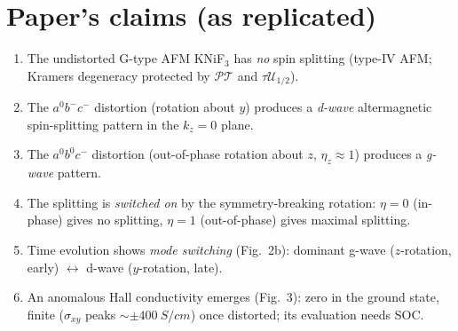 \documentclass[11pt]{article}
\begin{document}
\section{Paper's claims (as replicated)}
\begin{enumerate}
\item[(P1)] The undistorted G-type AFM KNiF$_3$ has \emph{no} spin splitting (type-IV AFM;
Kramers degeneracy protected by $\mathcal{PT}$ and $\tau\mathcal{U}_{1/2}$).
\item[(P2)] The $a^0b^-c^-$ distortion (rotation about $y$) produces a \emph{d-wave}
altermagnetic spin-splitting pattern in the $k_z{=}0$ plane.
\item[(P3)] The $a^0b^0c^-$ distortion (out-of-phase rotation about $z$, $\eta_z\approx1$)
produces a \emph{g-wave} pattern.
\item[(P4)] The splitting is \emph{switched on} by the symmetry-breaking rotation:
$\eta=0$ (in-phase) gives no splitting, $\eta=1$ (out-of-phase) gives maximal splitting.
\item[(P5)] Time evolution shows \emph{mode switching} (Fig.~2b): dominant g-wave
($z$-rotation, early) $\leftrightarrow$ d-wave ($y$-rotation, late).
\item[(P6)] An anomalous Hall conductivity emerges (Fig.~3): zero in the ground state,
finite ($\sigma_{xy}$ peaks $\sim\pm\SI{400}{S/cm}$) once distorted; its evaluation needs SOC.
\end{enumerate}
\end{document}

